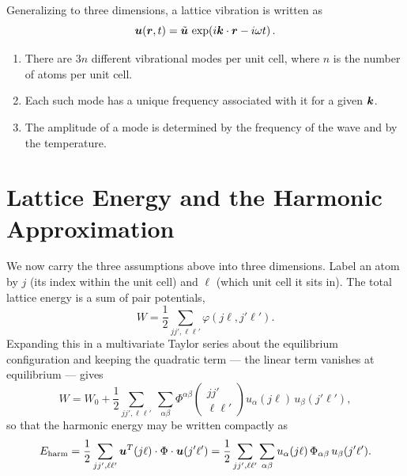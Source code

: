 Generalizing to three dimensions, a lattice vibration is written as
\begin{equation}
    \bm{u}(\bm{r}, t) = \tilde{\bm{u}}\,\exp\!\left(i\bm{k}\cdot\bm{r} - i\omega t\right).
\end{equation}

\begin{fact}
\begin{enumerate}
    \item There are $3n$ different vibrational modes per unit cell, where $n$ is the number of atoms per unit cell.
    \item Each such mode has a unique frequency associated with it for a given $\bm{k}$.
    \item The amplitude of a mode is determined by the frequency of the wave and by the temperature.
\end{enumerate}
\end{fact}

\section{Lattice Energy and the Harmonic Approximation}

We now carry the three assumptions above into three dimensions. Label an atom by $j$ (its index within the unit cell) and $\ell$ (which unit cell it sits in). The total lattice energy is a sum of pair potentials,
\begin{equation}
    W = \frac{1}{2}\sum_{jj',\ell\ell'} \varphi(j\ell, j'\ell').
\end{equation}
Expanding this in a multivariate Taylor series about the equilibrium configuration and keeping the quadratic term --- the linear term vanishes at equilibrium --- gives
\begin{equation}
    W = W_0 + \frac{1}{2}\sum_{jj',\ell\ell'}\ \sum_{\alpha\beta} \Phi^{\alpha\beta}\!\begin{pmatrix} jj' \\ \ell\ell'\end{pmatrix} u_\alpha(j\ell)\, u_\beta(j'\ell'),
\end{equation}
so that the harmonic energy may be written compactly as
\begin{equation}
    E_{\text{harm}} = \frac{1}{2}\sum_{jj',\ell\ell'} \bm{u}^{T}(j\ell)\cdot \Phi \cdot \bm{u}(j'\ell')
    = \frac{1}{2}\sum_{jj',\ell\ell'}\sum_{\alpha\beta} u_\alpha(j\ell)\, \Phi_{\alpha\beta}\, u_\beta(j'\ell').
\end{equation}

